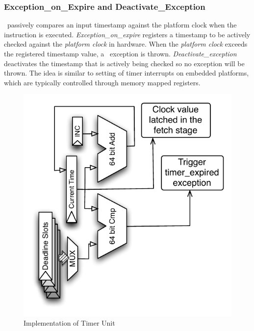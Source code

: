 \subsubsection{Exception\_on\_Expire and Deactivate\_Exception}
\Delayuntil\ passively compares an input timestamp against the platform clock when the instruction is executed.
\emph{Exception\_on\_expire} registers a timestamp to be actively checked against the \emph{platform clock} in hardware.
When the \emph{platform clock} exceeds the registered timestamp value, a \timerexpired\ exception is thrown.
\emph{Deactivate\_exception} deactivates the timestamp that is actively being checked so no exception will be thrown.
The idea is similar to setting of timer interrupts on embedded platforms, which are typically controlled through memory mapped registers.

\begin{figure}
  \vspace{-20pt}
  \begin{center}
    \includegraphics[scale=.6]{figs/timer_unit_circuit}
  \end{center}
  \vspace{-5mm}
  \caption{Implementation of Timer Unit}
  \label{fig:timer_unit_circuit}
  \vspace{-13pt}
\end{figure} 

